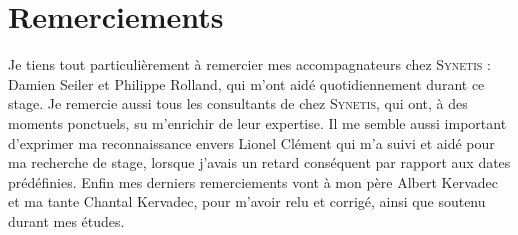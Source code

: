 \section*{Remerciements}

Je tiens tout particulièrement à remercier mes accompagnateurs chez \textsc{Synetis} : Damien Seiler et Philippe Rolland, qui m'ont aidé quotidiennement durant ce stage. Je remercie aussi tous les consultants de chez \textsc{Synetis}, qui ont, à des moments ponctuels, su m'enrichir de leur expertise. Il me semble aussi important d'exprimer ma reconnaissance envers Lionel Clément qui m'a suivi et aidé pour ma recherche de stage, lorsque j'avais un retard conséquent par rapport aux dates prédéfinies. Enfin mes derniers remerciements vont à mon père Albert Kervadec et ma tante Chantal Kervadec, pour m'avoir relu et corrigé, ainsi que soutenu durant mes études.